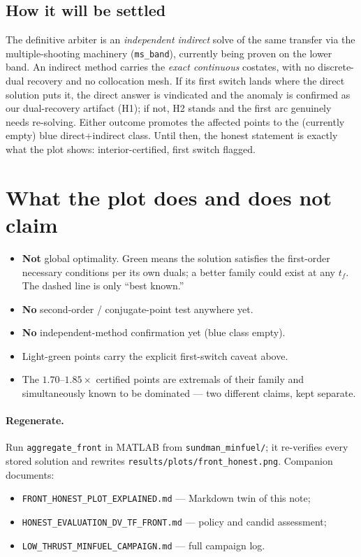 \documentclass[11pt]{article}
\newcommand{\tf}{t_f}
\begin{document}
\subsection{How it will be settled}

The definitive arbiter is an \emph{independent indirect} solve of the same
transfer via the multiple-shooting machinery (\texttt{ms\_band}), currently being
proven on the lower band. An indirect method carries the \emph{exact continuous}
costates, with no discrete-dual recovery and no collocation mesh. If its first
switch lands where the direct solution puts it, the direct answer is vindicated
and the anomaly is confirmed as our dual-recovery artifact (H1); if not, H2
stands and the first arc genuinely needs re-solving. Either outcome promotes the
affected points to the (currently empty) blue direct+indirect class. Until then,
the honest statement is exactly what the plot shows: interior-certified, first
switch flagged.

\section{What the plot does and does not claim}

\begin{itemize}
\item \textbf{Not} global optimality. Green means the solution satisfies the
first-order necessary conditions per its own duals; a better family could exist
at any $\tf$. The dashed line is only ``best known.''
\item \textbf{No} second-order / conjugate-point test anywhere yet.
\item \textbf{No} independent-method confirmation yet (blue class empty).
\item Light-green points carry the explicit first-switch caveat above.
\item The $1.70$--$1.85\times$ certified points are extremals of their family and
simultaneously known to be dominated --- two different claims, kept separate.
\end{itemize}

\paragraph{Regenerate.} Run \texttt{aggregate\_front} in MATLAB from
\texttt{sundman\_minfuel/}; it re-verifies every stored solution and rewrites
\texttt{results/plots/front\_honest.png}. Companion documents:
\begin{itemize}
\item \texttt{FRONT\_HONEST\_PLOT\_EXPLAINED.md} --- Markdown twin of this note;
\item \texttt{HONEST\_EVALUATION\_DV\_TF\_FRONT.md} --- policy and candid assessment;
\item \texttt{LOW\_THRUST\_MINFUEL\_CAMPAIGN.md} --- full campaign log.
\end{itemize}
\end{document}
